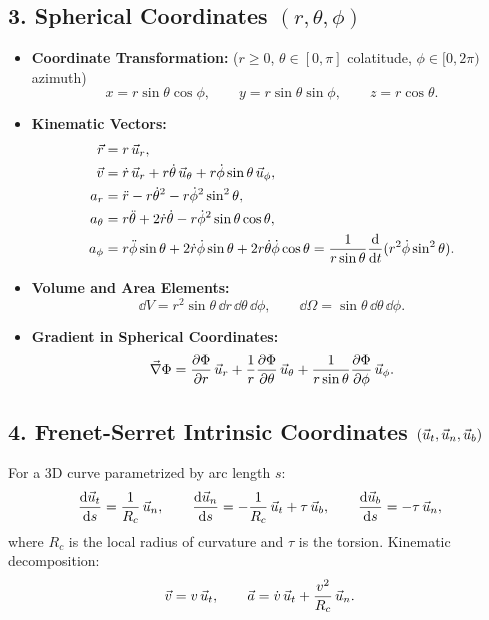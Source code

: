 \subsection{3. Spherical Coordinates $(r, \theta, \phi)$}
\begin{itemize}[leftmargin=1.5em,itemsep=3pt]
  \item \textbf{Coordinate Transformation:} ($r \ge 0$, $\theta \in [0, \pi]$ colatitude, $\phi \in [0, 2\pi)$ azimuth)
  \[
  x = r\sin\theta\cos\phi, \qquad y = r\sin\theta\sin\phi, \qquad z = r\cos\theta.
  \]
  \item \textbf{Kinematic Vectors:}
  \begin{align*}
  \vec{r} &= r\,\vec{u}_r, \\
  \vec{v} &= \dot{r}\,\vec{u}_r + r\dot{\theta}\,\vec{u}_\theta + r\dot{\phi}\sin\theta\,\vec{u}_\phi, \\
  a_r &= \ddot{r} - r\dot{\theta}^2 - r\dot{\phi}^2\sin^2\theta, \\
  a_\theta &= r\ddot{\theta} + 2\dot{r}\dot{\theta} - r\dot{\phi}^2\sin\theta\cos\theta, \\
  a_\phi &= r\ddot{\phi}\sin\theta + 2\dot{r}\dot{\phi}\sin\theta + 2r\dot{\theta}\dot{\phi}\cos\theta = \frac{1}{r\sin\theta}\frac{\mathrm{d}}{\mathrm{d} t}(r^2\dot{\phi}\sin^2\theta).
  \end{align*}
  \item \textbf{Volume and Area Elements:}
  \[
  \dd V = r^2\sin\theta\,\dd r\,\dd\theta\,\dd\phi, \qquad \dd\Omega = \sin\theta\,\dd\theta\,\dd\phi.
  \]
  \item \textbf{Gradient in Spherical Coordinates:}
  \[
  \vec{\nabla}\Phi = \frac{\partial\Phi}{\partial r}\,\vec{u}_r + \frac{1}{r}\frac{\partial\Phi}{\partial\theta}\,\vec{u}_\theta + \frac{1}{r\sin\theta}\frac{\partial\Phi}{\partial\phi}\,\vec{u}_\phi.
  \]
\end{itemize}

\subsection{4. Frenet-Serret Intrinsic Coordinates $(\vec{u}_t, \vec{u}_n, \vec{u}_b)$}
For a 3D curve parametrized by arc length $s$:
\begin{equation}
\frac{\mathrm{d}\vec{u}_t}{\mathrm{d} s} = \frac{1}{R_c}\,\vec{u}_n, \qquad \frac{\mathrm{d}\vec{u}_n}{\mathrm{d} s} = -\frac{1}{R_c}\,\vec{u}_t + \tau\,\vec{u}_b, \qquad \frac{\mathrm{d}\vec{u}_b}{\mathrm{d} s} = -\tau\,\vec{u}_n,
\end{equation}
where $R_c$ is the local radius of curvature and $\tau$ is the torsion.
Kinematic decomposition:
\begin{equation}
\vec{v} = v\,\vec{u}_t, \qquad \vec{a} = \dot{v}\,\vec{u}_t + \frac{v^2}{R_c}\,\vec{u}_n.
\end{equation}

